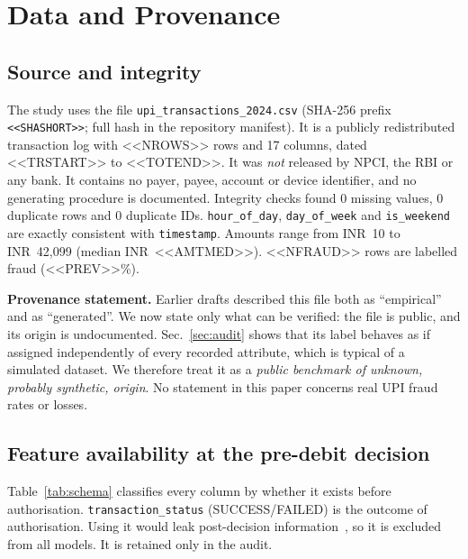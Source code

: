\documentclass[conference]{IEEEtran}
\newcommand{\inr}{INR~}
\begin{document}
\section{Data and Provenance}\label{sec:data}
\subsection{Source and integrity}
The study uses the file \texttt{upi\_transactions\_2024.csv} (SHA-256 prefix \texttt{<<SHASHORT>>}; full hash in the repository manifest). It is a publicly redistributed transaction log with <<NROWS>> rows and 17 columns, dated <<TRSTART>> to <<TOTEND>>. It was \emph{not} released by NPCI, the RBI or any bank. It contains no payer, payee, account or device identifier, and no generating procedure is documented. Integrity checks found 0 missing values, 0 duplicate rows and 0 duplicate IDs. \texttt{hour\_of\_day}, \texttt{day\_of\_week} and \texttt{is\_weekend} are exactly consistent with \texttt{timestamp}. Amounts range from \inr10 to \inr42,099 (median \inr<<AMTMED>>). <<NFRAUD>> rows are labelled fraud (<<PREV>>\%).

\textbf{Provenance statement.} Earlier drafts described this file both as ``empirical'' and as ``generated''. We now state only what can be verified: the file is public, and its origin is undocumented. Sec.~\ref{sec:audit} shows that its label behaves as if assigned independently of every recorded attribute, which is typical of a simulated dataset. We therefore treat it as a \emph{public benchmark of unknown, probably synthetic, origin}. No statement in this paper concerns real UPI fraud rates or losses.

\subsection{Feature availability at the pre-debit decision}
Table~\ref{tab:schema} classifies every column by whether it exists before authorisation. \texttt{transaction\_status} (SUCCESS/FAILED) is the outcome of authorisation. Using it would leak post-decision information~\cite{kaufman2012}, so it is excluded from all models. It is retained only in the audit.
\end{document}
